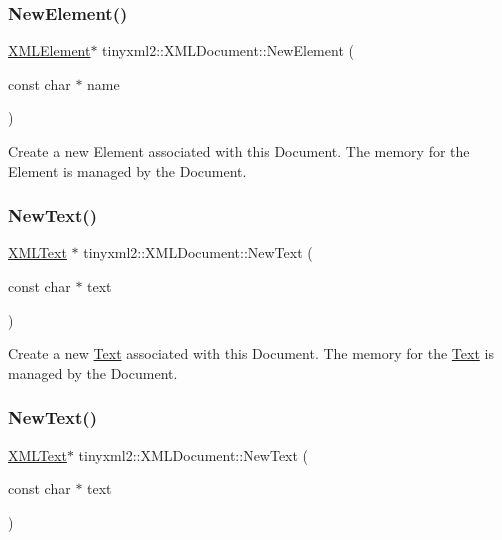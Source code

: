 \subsubsection{\texorpdfstring{New\+Element()}{NewElement()}\hspace{0.1cm}{\footnotesize\ttfamily [2/2]}}
{\footnotesize\ttfamily \hyperlink{classtinyxml2_1_1XMLElement}{X\+M\+L\+Element}$\ast$ tinyxml2\+::\+X\+M\+L\+Document\+::\+New\+Element (\begin{DoxyParamCaption}\item[{const char $\ast$}]{name }\end{DoxyParamCaption})}

Create a new Element associated with this Document. The memory for the Element is managed by the Document. \mbox{\label{classtinyxml2_1_1XMLDocument_acece5de77a0819f2341b08c1e1ed9987}} 
\subsubsection{\texorpdfstring{New\+Text()}{NewText()}\hspace{0.1cm}{\footnotesize\ttfamily [1/2]}}
{\footnotesize\ttfamily \hyperlink{classtinyxml2_1_1XMLText}{X\+M\+L\+Text} $\ast$ tinyxml2\+::\+X\+M\+L\+Document\+::\+New\+Text (\begin{DoxyParamCaption}\item[{const char $\ast$}]{text }\end{DoxyParamCaption})}

Create a new \hyperlink{classText}{Text} associated with this Document. The memory for the \hyperlink{classText}{Text} is managed by the Document. \mbox{\label{classtinyxml2_1_1XMLDocument_ab7e8b29ae4099092a8bb947da6361296}} 
\subsubsection{\texorpdfstring{New\+Text()}{NewText()}\hspace{0.1cm}{\footnotesize\ttfamily [2/2]}}
{\footnotesize\ttfamily \hyperlink{classtinyxml2_1_1XMLText}{X\+M\+L\+Text}$\ast$ tinyxml2\+::\+X\+M\+L\+Document\+::\+New\+Text (\begin{DoxyParamCaption}\item[{const char $\ast$}]{text }\end{DoxyParamCaption})}

